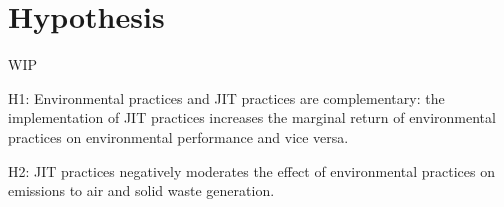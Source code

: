 \section{Hypothesis}
WIP

H1: Environmental practices and JIT practices are complementary: the implementation of JIT practices increases the marginal return of environmental practices on environmental performance and vice versa.

H2: JIT practices negatively moderates the effect of environmental practices on emissions to air and solid waste generation.
